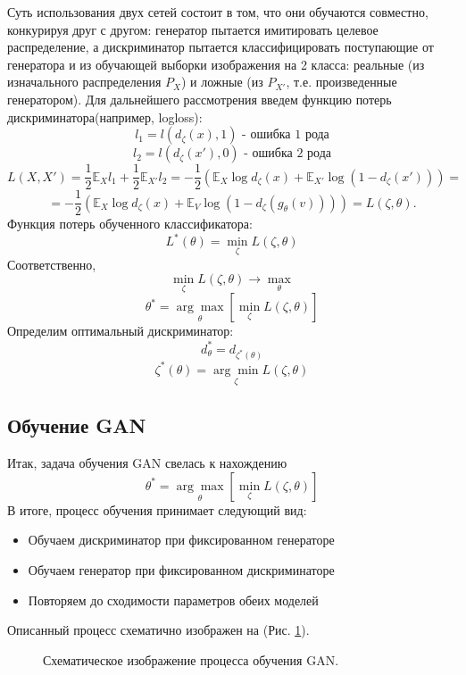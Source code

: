 		Суть использования двух сетей состоит в том, что они обучаются совместно, конкурируя друг с другом: генератор пытается имитировать целевое распределение, а дискриминатор пытается классифицировать поступающие от генератора и из обучающей выборки изображения на 2 класса: реальные (из изначального распределения $P_X$) и ложные (из $P_{X'}$, т.е. произведенные генератором).
		Для дальнейшего рассмотрения введем функцию потерь дискриминатора(например, logloss):
		$$ l_1 = l(d_{\zeta}(x), 1) \text{ - ошибка 1 рода} $$
		$$ l_2 = l(d_{\zeta}(x'), 0) \text{ - ошибка 2 рода}$$
		$$ L(X, X') = \frac{1}{2} \mathbb{E}_{X} l_1 + \frac{1}{2} \mathbb{E}_{X'} l_2 = -\frac{1}{2} (\mathbb{E}_{X} \log d_{\zeta}(x) + \mathbb{E}_{X'} \log (1 - d_{\zeta}(x'))) = $$
		$$ =  -\frac{1}{2} (\mathbb{E}_{X} \log d_{\zeta}(x) + \mathbb{E}_{V} \log (1 - d_{\zeta}(g_{\theta}(v)))) = L(\zeta, \theta) .$$
		Функция потерь обученного классификатора:
		$$ L^*(\theta) = \underset{\zeta}{\min} L(\zeta, \theta) $$
		Соответственно,
		$$ \underset{\zeta}{\min} L(\zeta, \theta) \longrightarrow \underset{\theta}{\max} $$
		$$ \theta^* = \underset{\theta}{\arg\max} \left[ \underset{\zeta}{\min} L(\zeta, \theta) \right] $$
		Определим оптимальный дискриминатор:
		$$ d^*_{\theta} = d_{\zeta^*(\theta)} $$
		$$ \zeta^*(\theta) =  \underset{\zeta}{\arg\min} L(\zeta, \theta)$$
	\subsection{Обучение GAN}
		Итак, задача обучения GAN свелась к нахождению
		$$ \theta^* = \underset{\theta}{\arg\max} \left[ \underset{\zeta}{\min} L(\zeta, \theta) \right] $$
		В итоге, процесс обучения принимает следующий вид:
		
		\begin{itemize}
			\item Обучаем дискриминатор при фиксированном генераторе
			\item Обучаем генератор при фиксированном дискриминаторе
			\item Повторяем до сходимости параметров обеих моделей
		\end{itemize}
		
		Описанный процесс схематично изображен на (Рис. \ref{5-gan-training}).
		
		\begin{figure}[h]
			\caption{Схематическое изображение процесса обучения GAN.}
			\label{5-gan-training}
		\end{figure}
		
